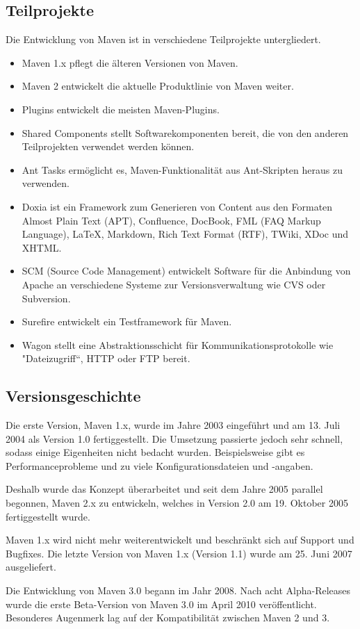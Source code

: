 \subsection{Teilprojekte}
Die Entwicklung von Maven ist in verschiedene Teilprojekte untergliedert.
\begin{itemize}
\item Maven 1.x pflegt die älteren Versionen von Maven.
\item Maven 2 entwickelt die aktuelle Produktlinie von Maven weiter.
\item Plugins entwickelt die meisten Maven-Plugins.
\item Shared Components stellt Softwarekomponenten bereit, die von den anderen Teilprojekten verwendet werden können.
\item Ant Tasks ermöglicht es, Maven-Funktionalität aus Ant-Skripten heraus zu verwenden.
\item Doxia ist ein Framework zum Generieren von Content aus den Formaten Almost Plain Text (APT), Confluence, DocBook, FML (FAQ Markup Language), LaTeX, Markdown, Rich Text Format (RTF), TWiki, XDoc und XHTML.
\item SCM (Source Code Management) entwickelt Software für die Anbindung von Apache an verschiedene Systeme zur Versionsverwaltung wie CVS oder Subversion.
\item Surefire entwickelt ein Testframework für Maven.
\item Wagon stellt eine Abstraktionsschicht für Kommunikationsprotokolle wie "Dateizugriff“, HTTP oder FTP bereit.
\end{itemize}

\subsection{Versionsgeschichte}
Die erste Version, Maven 1.x, wurde im Jahre 2003 eingeführt und am 13. Juli 2004 als Version 1.0 fertiggestellt. Die Umsetzung passierte jedoch sehr schnell, sodass einige Eigenheiten nicht bedacht wurden. Beispielsweise gibt es Performanceprobleme und zu viele Konfigurationsdateien und -angaben.

Deshalb wurde das Konzept überarbeitet und seit dem Jahre 2005 parallel begonnen, Maven 2.x zu entwickeln, welches in Version 2.0 am 19. Oktober 2005 fertiggestellt wurde.

Maven 1.x wird nicht mehr weiterentwickelt und beschränkt sich auf Support und Bugfixes. Die letzte Version von Maven 1.x (Version 1.1) wurde am 25. Juni 2007 ausgeliefert.

Die Entwicklung von Maven 3.0 begann im Jahr 2008. Nach acht Alpha-Releases wurde die erste Beta-Version von Maven 3.0 im April 2010 veröffentlicht. Besonderes Augenmerk lag auf der Kompatibilität zwischen Maven 2 und 3.


